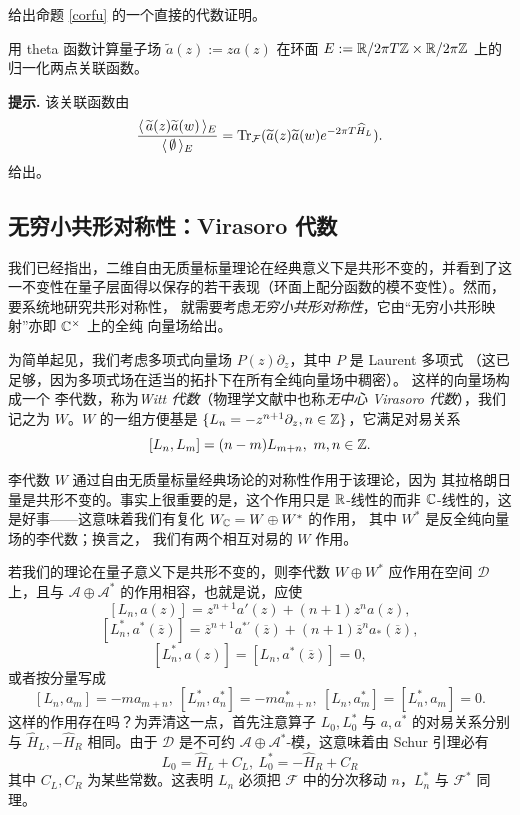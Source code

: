 \begin{exercise}
给出命题 \ref{corfu} 的一个直接的代数证明。
\end{exercise}  

\begin{exercise}
用 theta 函数计算量子场 $\widetilde a(z):=za(z)$ 在环面 $E:=\Bbb R/2\pi T\Bbb Z\times \Bbb R/2\pi \Bbb Z$ 上的归一化两点关联函数。

\textbf{提示.} 该关联函数由
$$
\frac{\la \widetilde a(z)\widetilde a(w)\ra_E}{\la \emptyset\ra_E}={\rm Tr}_{\mathcal F}(\widetilde a(z)\widetilde a(w)e^{-2\pi T\widehat H_L}).
$$
给出。
\end{exercise} 

\subsection{无穷小共形对称性：Virasoro 代数} 

我们已经指出，二维自由无质量标量理论在经典意义下是共形不变的，并看到了这一不变性在量子层面得以保存的若干表现（环面上配分函数的模不变性）。然而，要系统地研究共形对称性，
就需要考虑\emph{无穷小共形对称性}，它由“无穷小共形映射”亦即 $\Bbb C^\times$ 上的全纯
向量场给出。

为简单起见，我们考虑多项式向量场 $P(z)\partial_z$，其中 $P$ 是 Laurent 多项式
（这已足够，因为多项式场在适当的拓扑下在所有全纯向量场中稠密）。
这样的向量场构成一个 李代数，称为\emph{Witt 代数}\label{Witt algebra}（物理学文献中也称\emph{无中心
Virasoro 代数}），我们记之为 $W$。$W$ 的一组方便基是 $\lbrace L_n=-z^{n+1}\partial_z, n\in \Bbb Z\rbrace$，它满足对易关系
$$
[L_n,L_m]=(n-m)L_{m+n},\ m,n\in \Bbb Z.
$$

李代数 $W$ 通过自由无质量标量经典场论的对称性作用于该理论，因为
其拉格朗日量是共形不变的。事实上很重要的是，这个作用只是 $\Bbb R$-线性的而非 $\Bbb C$-线性的，这是好事——这意味着我们有复化 $W_{\Bbb C}=W\oplus W^*$ 的作用，
其中 $W^*$ 是反全纯向量场的李代数；换言之，
我们有两个相互对易的 $W$ 作用。

若我们的理论在量子意义下是共形不变的，则李代数 $W\oplus W^*$
应作用在空间 $\mathcal D$ 上，且与 $\mathcal A\oplus \mathcal A^*$ 的作用相容，也就是说，应使
$$
[L_n,a(z)]=z^{n+1}a'(z)+(n+1)z^na(z), 
$$
$$
[L_n^*,a^*(\overline z)]=\overline z^{n+1}a^{*\prime}(\overline z)+(n+1)\overline z^na_*(\overline z),
$$
$$
[L_n^*,a(z)]=[L_n,a^*(\overline z)]=0,
$$
或者按分量写成
$$
[L_n,a_m]=-ma_{m+n},\ [L_m^*,a_n^*]=-ma_{m+n}^*,\ [L_n,a_m^*]=[L_n^*,a_m]=0.
$$
这样的作用存在吗？为弄清这一点，首先注意算子 $L_0, L_0^*$ 与 $a,a^*$ 的对易关系分别与 $\widehat H_L,-\widehat H_R$ 相同。由于 $\mathcal D$ 是不可约 $\mathcal A\oplus \mathcal A^*$-模，这意味着由 Schur 引理必有
$$
L_0=\widehat H_L+C_L,\ L_0^*=-\widehat H_R+C_R
$$
其中 $C_L,C_R$ 为某些常数。这表明 $L_n$ 必须把 $\mathcal F$ 中的分次移动 $n$，$L_n^*$ 与 $\mathcal F^*$ 同理。


